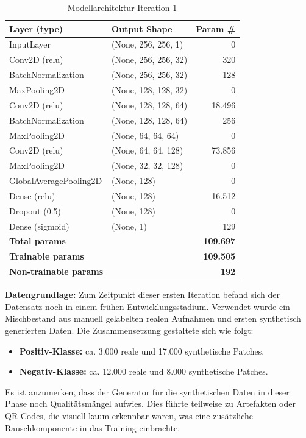 \documentclass[
    a4paper,        %
    11pt,           %
    ngerman,        %
    parskip=half,   %
    listof=totoc,   %
    bibliography=totoc %
]{scrartcl}
\begin{document}
\begin{table}[H]
    \centering
    \caption{Modellarchitektur Iteration 1}
    \label{tab:model_summary_iter1}
    \begin{tabular}{llr}
        \toprule
        \textbf{Layer (type)} & \textbf{Output Shape} & \textbf{Param \#} \\
        \midrule
        InputLayer & (None, 256, 256, 1) & 0 \\
        Conv2D (relu) & (None, 256, 256, 32) & 320 \\
        BatchNormalization & (None, 256, 256, 32) & 128 \\
        MaxPooling2D & (None, 128, 128, 32) & 0 \\
        Conv2D (relu) & (None, 128, 128, 64) & 18.496 \\
        BatchNormalization & (None, 128, 128, 64) & 256 \\
        MaxPooling2D & (None, 64, 64, 64) & 0 \\
        Conv2D (relu) & (None, 64, 64, 128) & 73.856 \\
        MaxPooling2D & (None, 32, 32, 128) & 0 \\
        GlobalAveragePooling2D & (None, 128) & 0 \\
        Dense (relu) & (None, 128) & 16.512 \\
        Dropout (0.5) & (None, 128) & 0 \\
        Dense (sigmoid) & (None, 1) & 129 \\
        \midrule
        \textbf{Total params} & & \textbf{109.697} \\
        \textbf{Trainable params} & & \textbf{109.505} \\
        \textbf{Non-trainable params} & & \textbf{192} \\
        \bottomrule
    \end{tabular}
\end{table}

\textbf{Datengrundlage:}
Zum Zeitpunkt dieser ersten Iteration befand sich der Datensatz noch in einem frühen Entwicklungsstadium. Verwendet wurde ein Mischbestand aus manuell gelabelten realen Aufnahmen und ersten synthetisch generierten Daten. Die Zusammensetzung gestaltete sich wie folgt:
\begin{itemize}
    \item \textbf{Positiv-Klasse:} ca. 3.000 reale und 17.000 synthetische Patches.
    \item \textbf{Negativ-Klasse:} ca. 12.000 reale und 8.000 synthetische Patches.
\end{itemize}
Es ist anzumerken, dass der Generator für die synthetischen Daten in dieser Phase noch Qualitätsmängel aufwies. Dies führte teilweise zu Artefakten oder QR-Codes, die visuell kaum erkennbar waren, was eine zusätzliche Rauschkomponente in das Training einbrachte.
\end{document}
